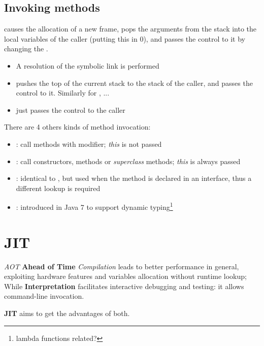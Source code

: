 \subsection{Invoking methods}
 causes the allocation of a new frame, pops the arguments from the stack into the local variables of the caller (putting this in 0),
and passes the control to it by changing the .
\begin{itemize}
    \item A resolution of the symbolic link is performed
    \item {} pushes the top of the current stack to the stack of the caller, and passes the control to it. Similarly for ,  ...
    \item {} just passes the control to the caller
\end{itemize}

{There are 4 others kinds of method invocation:\ns
\begin{itemize}
    \item {}: call methods with  modifier; \textit{this} is not passed
    \item {}: call constructors,  methods or \textit{superclass} methods; \textit{this} is always passed 
    \item {}: identical to , but used when the method is declared in an interface, thus a different lookup is required
    \item {}: introduced in Java 7 to support dynamic typing\footnote{lambda functions related?}
\end{itemize}}

\section{JIT}
\textit{AOT} \textbf{Ahead of Time} \textit{Compilation} leads to better performance in general, exploiting hardware features and variables allocation without runtime lookup;
While \textbf{Interpretation} facilitates interactive debugging and testing: it allows command-line invocation.

\textbf{JIT} aims to get the advantages of both.

